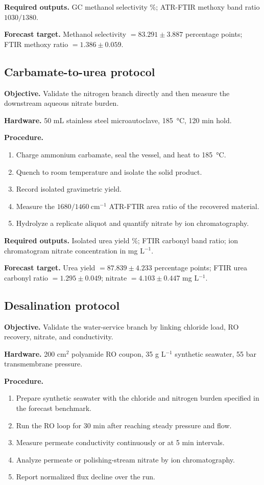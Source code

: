\documentclass[11pt]{article}
\begin{document}
\textbf{Required outputs.} GC methanol selectivity \%; ATR-FTIR methoxy band ratio \(1030/1380\).

\textbf{Forecast target.} Methanol selectivity \(= 83.291 \pm 3.887\) percentage points; FTIR methoxy ratio \(= 1.386 \pm 0.059\).

\subsection{Carbamate-to-urea protocol}

\textbf{Objective.} Validate the nitrogen branch directly and then measure the downstream aqueous nitrate burden.

\textbf{Hardware.} 50 mL stainless steel microautoclave, \SI{185}{\degreeCelsius}, 120 min hold.

\textbf{Procedure.}
\begin{enumerate}[leftmargin=1.5em]
\item Charge ammonium carbamate, seal the vessel, and heat to \SI{185}{\degreeCelsius}.
\item Quench to room temperature and isolate the solid product.
\item Record isolated gravimetric yield.
\item Measure the \(1680/1460~\mathrm{cm^{-1}}\) ATR-FTIR area ratio of the recovered material.
\item Hydrolyze a replicate aliquot and quantify nitrate by ion chromatography.
\end{enumerate}

\textbf{Required outputs.} Isolated urea yield \%; FTIR carbonyl band ratio; ion chromatogram nitrate concentration in mg L\(^{-1}\).

\textbf{Forecast target.} Urea yield \(= 87.839 \pm 4.233\) percentage points; FTIR urea carbonyl ratio \(= 1.295 \pm 0.049\); nitrate \(= 4.103 \pm 0.447\) mg L\(^{-1}\).

\subsection{Desalination protocol}

\textbf{Objective.} Validate the water-service branch by linking chloride load, RO recovery, nitrate, and conductivity.

\textbf{Hardware.} 200 cm\(^2\) polyamide RO coupon, 35 g L\(^{-1}\) synthetic seawater, 55 bar transmembrane pressure.

\textbf{Procedure.}
\begin{enumerate}[leftmargin=1.5em]
\item Prepare synthetic seawater with the chloride and nitrogen burden specified in the forecast benchmark.
\item Run the RO loop for 30 min after reaching steady pressure and flow.
\item Measure permeate conductivity continuously or at 5 min intervals.
\item Analyze permeate or polishing-stream nitrate by ion chromatography.
\item Report normalized flux decline over the run.
\end{enumerate}
\end{document}
